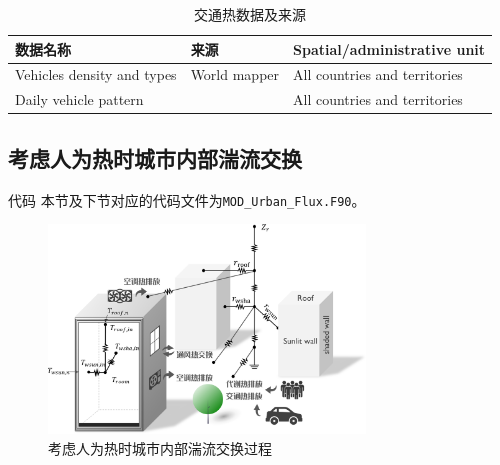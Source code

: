 \begin{table}[htbp]
    \centering
\caption{交通热数据及来源}\label{tab:交通热数据及来源}
    \begin{tabular}{@{}lll@{}}
    \toprule
    数据名称                       & 来源                          & Spatial/administrative unit   \\ \midrule
    Vehicles density and types & World mapper                & All countries and territories \\
    Daily vehicle pattern      & \citet{Hallenbeck1997} & All countries and territories \\\bottomrule
    \end{tabular}
\end{table}

\subsection{考虑人为热时城市内部湍流交换}

\begin{mymdframed}{代码}
本节及下节对应的代码文件为\texttt{MOD\_Urban\_Flux.F90}。
\end{mymdframed}
{
\begin{figure}[h!]
\centering
\includegraphics[width=0.75\textwidth]{Figures/城市模式/CoLM城市模式人为热阻抗交换网络.png}
\caption{考虑人为热时城市内部湍流交换过程}
\label{fig:考虑人为热时城市内部湍流交换过程}
\end{figure}
}

